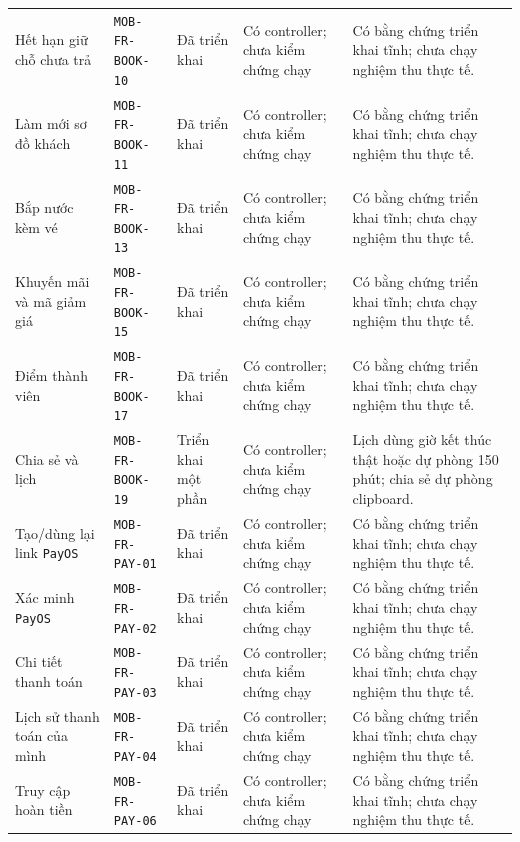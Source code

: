 \begin{longtable}{@{}P{0.19000\SRSWidth}P{0.18000\SRSWidth}P{0.15000\SRSWidth}P{0.20000\SRSWidth}P{0.28000\SRSWidth}@{}}
Hết hạn giữ chỗ chưa trả & \texttt{MOB-\allowbreak{}FR-\allowbreak{}BOOK-\allowbreak{}10} & Đã triển khai & Có controller; chưa kiểm chứng chạy & Có bằng chứng triển khai tĩnh; chưa chạy nghiệm thu thực tế. \\[3pt]
Làm mới sơ đồ khách & \texttt{MOB-\allowbreak{}FR-\allowbreak{}BOOK-\allowbreak{}11} & Đã triển khai & Có controller; chưa kiểm chứng chạy & Có bằng chứng triển khai tĩnh; chưa chạy nghiệm thu thực tế. \\[3pt]
Bắp nước kèm vé & \texttt{MOB-\allowbreak{}FR-\allowbreak{}BOOK-\allowbreak{}13} & Đã triển khai & Có controller; chưa kiểm chứng chạy & Có bằng chứng triển khai tĩnh; chưa chạy nghiệm thu thực tế. \\[3pt]
Khuyến mãi và mã giảm giá & \texttt{MOB-\allowbreak{}FR-\allowbreak{}BOOK-\allowbreak{}15} & Đã triển khai & Có controller; chưa kiểm chứng chạy & Có bằng chứng triển khai tĩnh; chưa chạy nghiệm thu thực tế. \\[3pt]
Điểm thành viên & \texttt{MOB-\allowbreak{}FR-\allowbreak{}BOOK-\allowbreak{}17} & Đã triển khai & Có controller; chưa kiểm chứng chạy & Có bằng chứng triển khai tĩnh; chưa chạy nghiệm thu thực tế. \\[3pt]
Chia sẻ và lịch & \texttt{MOB-\allowbreak{}FR-\allowbreak{}BOOK-\allowbreak{}19} & Triển khai một phần & Có controller; chưa kiểm chứng chạy & Lịch dùng giờ kết thúc thật hoặc dự phòng 150 phút; chia sẻ dự phòng clipboard. \\[3pt]
Tạo/\allowbreak{}dùng lại link \texttt{Pay\allowbreak{}OS} & \texttt{MOB-\allowbreak{}FR-\allowbreak{}PAY-\allowbreak{}01} & Đã triển khai & Có controller; chưa kiểm chứng chạy & Có bằng chứng triển khai tĩnh; chưa chạy nghiệm thu thực tế. \\[3pt]
Xác minh \texttt{Pay\allowbreak{}OS} & \texttt{MOB-\allowbreak{}FR-\allowbreak{}PAY-\allowbreak{}02} & Đã triển khai & Có controller; chưa kiểm chứng chạy & Có bằng chứng triển khai tĩnh; chưa chạy nghiệm thu thực tế. \\[3pt]
Chi tiết thanh toán & \texttt{MOB-\allowbreak{}FR-\allowbreak{}PAY-\allowbreak{}03} & Đã triển khai & Có controller; chưa kiểm chứng chạy & Có bằng chứng triển khai tĩnh; chưa chạy nghiệm thu thực tế. \\[3pt]
Lịch sử thanh toán của mình & \texttt{MOB-\allowbreak{}FR-\allowbreak{}PAY-\allowbreak{}04} & Đã triển khai & Có controller; chưa kiểm chứng chạy & Có bằng chứng triển khai tĩnh; chưa chạy nghiệm thu thực tế. \\[3pt]
Truy cập hoàn tiền & \texttt{MOB-\allowbreak{}FR-\allowbreak{}PAY-\allowbreak{}06} & Đã triển khai & Có controller; chưa kiểm chứng chạy & Có bằng chứng triển khai tĩnh; chưa chạy nghiệm thu thực tế. \\[3pt]

\end{longtable}

